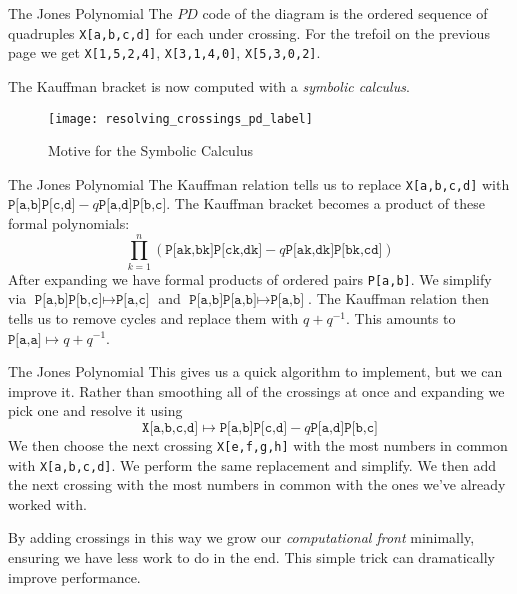 \documentclass{beamer}
\begin{document}
    \begin{frame}{The Jones Polynomial}
        The $PD$ code of the diagram is the ordered sequence of quadruples
        \texttt{X[a,b,c,d]} for each under crossing. For the trefoil on the
        previous page we get \texttt{X[1,5,2,4]}, \texttt{X[3,1,4,0]},
        \texttt{X[5,3,0,2]}.
        \par\hfill\par
        The Kauffman bracket is now computed with a \textit{symbolic calculus}.
        \begin{figure}
            \centering
            \texttt{[image: resolving\_crossings\_pd\_label]}
            \caption{Motive for the Symbolic Calculus}
        \end{figure}
    \end{frame}
    \begin{frame}{The Jones Polynomial}
        The Kauffman relation tells us to replace \texttt{X[a,b,c,d]} with
        $\texttt{P[a,b]P[c,d]}-q\texttt{P[a,d]P[b,c]}$. The Kauffman bracket
        becomes a product of these formal polynomials:
        \begin{equation}
            \prod_{k=1}^{n}(
                \texttt{P[ak,bk]P[ck,dk]}-q\texttt{P[ak,dk]P[bk,cd]}
            )
        \end{equation}
        After expanding we have formal products of ordered pairs
        \texttt{P[a,b]}. We simplify via
        $\texttt{P[a,b]P[b,c]}\mapsto\texttt{P[a,c]}$ and
        $\texttt{P[a,b]P[a,b]}\mapsto\texttt{P[a,b]}$. The Kauffman relation
        then tells us to remove cycles and replace them with $q+q^{-1}$.
        This amounts to $\texttt{P[a,a]}\mapsto{q}+q^{-1}$.
    \end{frame}
    \begin{frame}{The Jones Polynomial}
        This gives us a quick algorithm to implement, but we can improve it.
        Rather than smoothing all of the crossings at once and expanding we
        pick one and resolve it using
        \begin{equation}
            \nonumber
            \texttt{X[a,b,c,d]}
            \mapsto\texttt{P[a,b]P[c,d]}-q\texttt{P[a,d]P[b,c]}
        \end{equation}
        We then choose the next crossing \texttt{X[e,f,g,h]} with the most
        numbers in common with \texttt{X[a,b,c,d]}. We perform the same
        replacement and simplify. We then add the next crossing with the
        most numbers in common with the ones we've already worked with.
        \par\hfill\par
        By adding crossings in this way we grow our
        \textit{computational front} minimally, ensuring we have less work to
        do in the end. This simple trick can dramatically improve performance.
    \end{frame}
\end{document}

